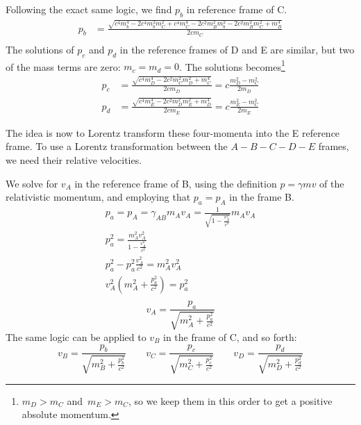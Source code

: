 \documentclass[12p,a4paper]{article}
\begin{document}
Following the exact same logic, we find $p_b$ in reference frame of C.
\begin{align*}
    p_b &= \frac{\sqrt{ c^4m_b^4 - 2c^4m_b^2m_C^2 + c^4m_C^4 - 2c^2m_B^2m_b^2 - 2c^2m_B^2 m_C^2 + m_B^4 }}{ 2cm_C } \\
\end{align*}
The solutions of $p_c$ and $p_d$ in the reference frames of D and E are similar, but two of the mass terms are zero: $m_c = m_d = 0$. The solutions becomes\footnote{$m_D > m_C$ and $m_E > m_C$, so we keep them in this order to get a positive absolute momentum.}
\begin{align*}
    p_c &= \frac{\sqrt{c^4m_D^4 - 2c^2m_C^2 m_D^2 + m_C^4 }}{ 2cm_D } = c\frac{m_D^2 - m_C^2}{2m_D} \\
    p_d &= \frac{\sqrt{c^4m_E^4 - 2c^2m_D^2 m_E^2 + m_D^4 }}{ 2cm_E } = c\frac{m_E^2 - m_C^2}{2m_E}
\end{align*}

The idea is now to Lorentz transform these four-momenta into the E reference frame. To use a Lorentz transformation between the $A-B-C-D-E$ frames, we need their relative velocities.

We solve for $v_A$ in the reference frame of B, using the definition $p = \gamma m v$ of the relativistic momentum, and employing that $p_a = p_A$ in the frame B.
\begin{gather*}
    p_a = p_A = \gamma_{AB}m_A v_A = \frac{1}{\sqrt{1-\frac{v_A^2}{c^2}}} m_A v_A \\
    p_a^2 = \frac{m_A^2 v_A^2}{1-\frac{v_A^2}{c^2}} \\
    p_a^2 - p_a^2\frac{v_A^2}{c^2} = m_A^2v_A^2 \\
    v_A^2(m_A^2 + \frac{p_a^2}{c^2}) = p_a^2 \\
\end{gather*}
\begin{equation}
    v_A = \frac{p_a}{\sqrt{m_A^2 + \frac{p_a^2}{c^2}}}
\end{equation}
The same logic can be applied to $v_B$ in the frame of C, and so forth:
\begin{equation}
    v_B = \frac{p_b}{\sqrt{m_B^2 + \frac{p_b^2}{c^2}}} \quad\quad
    v_C = \frac{p_c}{\sqrt{m_C^2 + \frac{p_c^2}{c^2}}} \quad\quad
    v_D = \frac{p_d}{\sqrt{m_D^2 + \frac{p_d^2}{c^2}}}
\end{equation}
\end{document}
